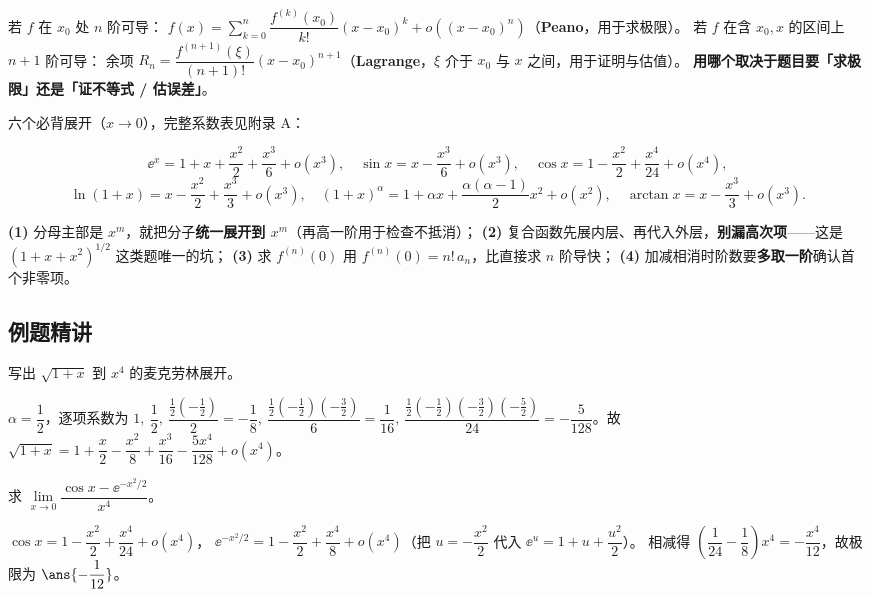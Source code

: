 \documentclass[11pt,a4paper]{ctexart}
\begin{document}
\begin{keypoint}
若 $f$ 在 $x_0$ 处 $n$ 阶可导：
$f(x)=\sum\limits_{k=0}^n\dfrac{f^{(k)}(x_0)}{k!}(x-x_0)^k+o\left((x-x_0)^n\right)$（\textbf{Peano}，用于求极限）。
若 $f$ 在含 $x_0,x$ 的区间上 $n+1$ 阶可导：
余项 $R_n=\dfrac{f^{(n+1)}(\xi)}{(n+1)!}(x-x_0)^{n+1}$（\textbf{Lagrange}，$\xi$ 介于 $x_0$ 与 $x$ 之间，用于证明与估值）。
\textbf{用哪个取决于题目要「求极限」还是「证不等式 / 估误差」}。
\end{keypoint}

\noindent 六个必背展开（$x\to0$），完整系数表见附录 A：

\[
\ee^x=1+x+\frac{x^2}{2}+\frac{x^3}{6}+o(x^3),\quad
\sin x=x-\frac{x^3}{6}+o(x^3),\quad
\cos x=1-\frac{x^2}{2}+\frac{x^4}{24}+o(x^4),
\]
\[
\ln(1+x)=x-\frac{x^2}{2}+\frac{x^3}{3}+o(x^3),\quad
(1+x)^\alpha=1+\alpha x+\frac{\alpha(\alpha-1)}{2}x^2+o(x^2),\quad
\arctan x=x-\frac{x^3}{3}+o(x^3).
\]

\begin{keypoint}[决策卡]
\textbf{(1)} 分母主部是 $x^m$，就把分子\textbf{统一展开到 $x^m$}（再高一阶用于检查不抵消）；
\textbf{(2)} 复合函数先展内层、再代入外层，\textbf{别漏高次项}——这是 $(1+x+x^2)^{1/2}$ 这类题唯一的坑；
\textbf{(3)} 求 $f^{(n)}(0)$ 用 $f^{(n)}(0)=n!\,a_n$，比直接求 $n$ 阶导快；
\textbf{(4)} 加减相消时阶数要\textbf{多取一阶}确认首个非零项。
\end{keypoint}

\subsection{例题精讲}

\begin{exa}
写出 $\sqrt{1+x}$ 到 $x^4$ 的麦克劳林展开。
\end{exa}
\begin{solution}
$\alpha=\dfrac12$，逐项系数为 $1,\ \dfrac12,\ \dfrac{\frac12(-\frac12)}{2}=-\dfrac18,\ 
\dfrac{\frac12(-\frac12)(-\frac32)}{6}=\dfrac1{16},\ 
\dfrac{\frac12(-\frac12)(-\frac32)(-\frac52)}{24}=-\dfrac5{128}$。故
$\sqrt{1+x}=1+\dfrac x2-\dfrac{x^2}{8}+\dfrac{x^3}{16}-\dfrac{5x^4}{128}+o(x^4)$。
\end{solution}

\begin{exa}[相消型极限要展开够阶]
求 $\lim\limits_{x\to0}\dfrac{\cos x-\ee^{-x^2/2}}{x^4}$。
\end{exa}
\begin{solution}
$\cos x=1-\dfrac{x^2}{2}+\dfrac{x^4}{24}+o(x^4)$，
$\ee^{-x^2/2}=1-\dfrac{x^2}{2}+\dfrac{x^4}{8}+o(x^4)$（把 $u=-\dfrac{x^2}{2}$ 代入 $\ee^u=1+u+\dfrac{u^2}{2}$）。
相减得 $\left(\dfrac1{24}-\dfrac18\right)x^4=-\dfrac{x^4}{12}$，故极限为 $\ans{-\dfrac1{12}}$。
\end{solution}
\end{document}
